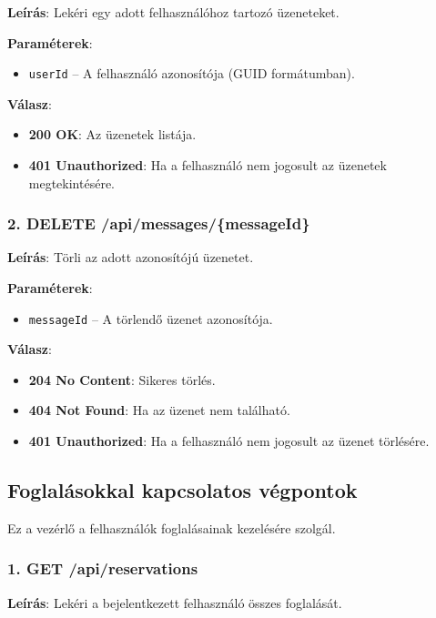 \documentclass{report}[11pt]
\begin{document}
\textbf{Leírás}:  
Lekéri egy adott felhasználóhoz tartozó üzeneteket.

\textbf{Paraméterek}:  
\begin{itemize}
    \item \texttt{userId} – A felhasználó azonosítója (GUID formátumban).
\end{itemize}

\textbf{Válasz}:  
\begin{itemize}
    \item \textbf{200 OK}: Az üzenetek listája.
    \item \textbf{401 Unauthorized}: Ha a felhasználó nem jogosult az üzenetek megtekintésére.
\end{itemize}

\subsubsection{2. DELETE /api/messages/\{messageId\}}

\textbf{Leírás}:  
Törli az adott azonosítójú üzenetet.

\textbf{Paraméterek}:  
\begin{itemize}
    \item \texttt{messageId} – A törlendő üzenet azonosítója.
\end{itemize}

\textbf{Válasz}:  
\begin{itemize}
    \item \textbf{204 No Content}: Sikeres törlés.
    \item \textbf{404 Not Found}: Ha az üzenet nem található.
    \item \textbf{401 Unauthorized}: Ha a felhasználó nem jogosult az üzenet törlésére.
\end{itemize}


\subsection{Foglalásokkal kapcsolatos végpontok}

Ez a vezérlő a felhasználók foglalásainak kezelésére szolgál.

\subsubsection{1. GET /api/reservations}

\textbf{Leírás}:  
Lekéri a bejelentkezett felhasználó összes foglalását.
\end{document}
